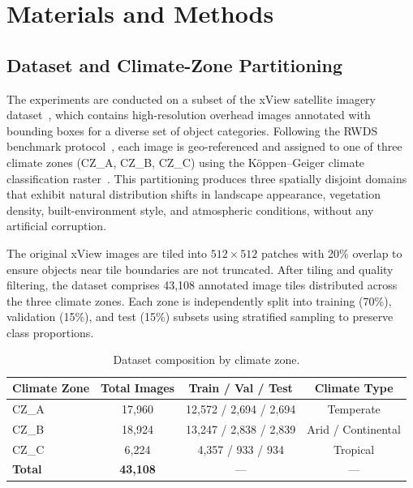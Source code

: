 \documentclass[12pt,a4paper]{article}
\begin{document}
\section{Materials and Methods}

\subsection{Dataset and Climate-Zone Partitioning}

The experiments are conducted on a subset of the xView satellite imagery dataset~\cite{shermeyer2020xview}, which contains high-resolution overhead images annotated with bounding boxes for a diverse set of object categories. Following the RWDS benchmark protocol~\cite{alemadi2025rwds}, each image is geo-referenced and assigned to one of three climate zones (CZ\_A, CZ\_B, CZ\_C) using the K\"{o}ppen--Geiger climate classification raster~\cite{beck2018koppen}. This partitioning produces three spatially disjoint domains that exhibit natural distribution shifts in landscape appearance, vegetation density, built-environment style, and atmospheric conditions, without any artificial corruption.

The original xView images are tiled into $512\times512$ patches with 20\% overlap to ensure objects near tile boundaries are not truncated. After tiling and quality filtering, the dataset comprises 43{,}108 annotated image tiles distributed across the three climate zones. Each zone is independently split into training (70\%), validation (15\%), and test (15\%) subsets using stratified sampling to preserve class proportions.

\begin{table}[H]
\centering
\caption{Dataset composition by climate zone.}
\label{tab:dataset_summary}
\begin{tabular}{lccc}
\toprule
\textbf{Climate Zone} & \textbf{Total Images} & \textbf{Train / Val / Test} & \textbf{Climate Type} \\
\midrule
CZ\_A & 17{,}960 & 12{,}572 / 2{,}694 / 2{,}694 & Temperate \\
CZ\_B & 18{,}924 & 13{,}247 / 2{,}838 / 2{,}839 & Arid / Continental \\
CZ\_C &  6{,}224 &  4{,}357 / 933 / 934          & Tropical \\
\midrule
\textbf{Total} & \textbf{43{,}108} & --- & --- \\
\bottomrule
\end{tabular}
\end{table}
\end{document}
